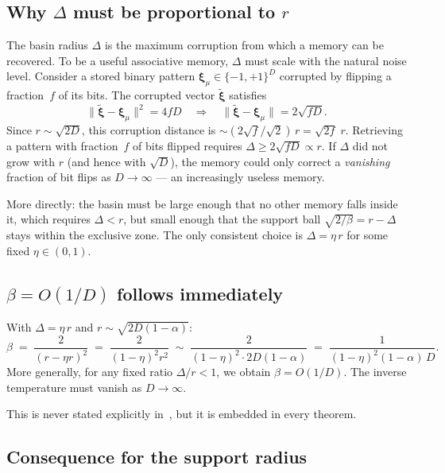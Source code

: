\documentclass[11pt]{article}
\begin{document}
\subsection{Why $\Delta$ must be proportional to $r$}

The basin radius $\Delta$ is the maximum corruption from which a memory can be
recovered.  To be a useful associative memory, $\Delta$ must scale with the
natural noise level.  Consider a stored binary pattern
$\boldsymbol{\xi}_\mu\in\{-1,+1\}^D$ corrupted by flipping a fraction~$f$ of
its bits.  The corrupted vector $\tilde{\boldsymbol{\xi}}$ satisfies
\begin{equation}
  \|\tilde{\boldsymbol{\xi}} - \boldsymbol{\xi}_\mu\|^2
  = 4fD
  \quad\Longrightarrow\quad
  \|\tilde{\boldsymbol{\xi}} - \boldsymbol{\xi}_\mu\| = 2\sqrt{fD}.
\end{equation}
Since $r \sim \sqrt{2D}$, this corruption distance is
$\sim (2\sqrt{f}/\sqrt{2})\,r = \sqrt{2f}\;r$.
Retrieving a pattern with fraction~$f$ of bits flipped requires
$\Delta \geq 2\sqrt{fD} \propto r$.  If $\Delta$ did not grow with $r$ (and
hence with $\sqrt{D}$), the memory could only correct a \emph{vanishing}
fraction of bit flips as $D\to\infty$ --- an increasingly useless memory.

More directly: the basin must be large enough that no other memory falls inside
it, which requires $\Delta < r$, but small enough that the support ball
$\sqrt{2/\beta} = r - \Delta$ stays within the exclusive zone.  The only
consistent choice is $\Delta = \eta\, r$ for some fixed $\eta \in (0,1)$.

\subsection{$\beta = O(1/D)$ follows immediately}

With $\Delta = \eta\, r$ and $r \sim \sqrt{2D(1-\alpha)}$:
\begin{equation}
  \beta
  \;=\; \frac{2}{(r - \eta r)^2}
  \;=\; \frac{2}{(1-\eta)^2 r^2}
  \;\sim\; \frac{2}{(1-\eta)^2 \cdot 2D(1-\alpha)}
  \;=\; \frac{1}{(1-\eta)^2(1-\alpha)\,D}.
\end{equation}
More generally, for any fixed ratio $\Delta/r < 1$, we obtain
$\beta = O(1/D)$.  The inverse temperature must vanish as $D\to\infty$.

This is never stated explicitly in~\cite{Hoover2025}, but it is embedded in
every theorem.

\subsection{Consequence for the support radius}
\end{document}

